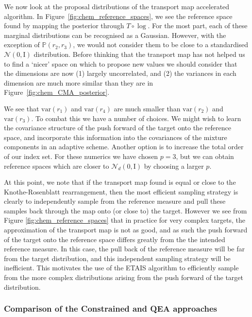 \documentclass[final]{siamltex}
\newcommand{\edit}[1]{{\color{red} #1}}
\begin{document}
\edit{
We now look at the proposal distributions of the transport map accelerated algorithm. In Figure~\ref{fig:chem_reference_spaces}, we see the reference space found by mapping the posterior through $T\circ\log$.} For the most part, each of these marginal distributions can be recognised as a Gaussian. However, with the exception of $\mathbb{P}(r_2,r_3)$, we would not consider them to be close to a standardised $\mathcal{N}(0, \text{I})$ distribution. Before thinking that the transport map has not helped us to find a `nicer' space on which to propose new values we should consider that the dimensions are now (1) largely uncorrelated, and (2) the variances in each dimension are much more similar than they are in Figure~\ref{fig:chem_CMA_posterior}.


\edit{We see that
$\text{var}(r_1)$ and $\text{var}(r_4)$ are much smaller than
$\text{var}(r_2)$ and $\text{var}(r_3)$. To combat this we have a
number of choices.} We might wish to learn the covariance structure of
the push forward of the target onto the reference space, and
incorporate this information into the covariances of the mixture
components in an adaptive scheme. Another option is to increase the
total order of our index set. For these numerics we have chosen $p=3$,
but we can obtain reference spaces which are closer to
$\mathcal{N}_d(0, \text{I})$ by choosing a larger $p$.

\edit{At this point, we note that if the transport map found is equal
  or close to the Knothe-Rosenblatt rearrangement, then the most
  efficient sampling strategy is clearly to independently sample from the
  reference measure and pull these samples back through the map onto
  (or close to) the target. However we see from Figure
  \ref{fig:chem_reference_spaces} that in practice for very complex
  targets, the approximation of the transport map is not as good, and
  as such the push forward of the target onto the reference
  space differs greatly from the the intended reference measure. In
  this case, the pull back of the reference measure will be far from
  the target distribution, and this independent sampling strategy
  will be inefficient. This motivates the use of the ETAIS algorithm
  to efficiently sample from the more complex distributions arising
  from the push forward of the target distribution. %
  }

\subsubsection{Comparison of the Constrained and QEA approaches}
\end{document}
